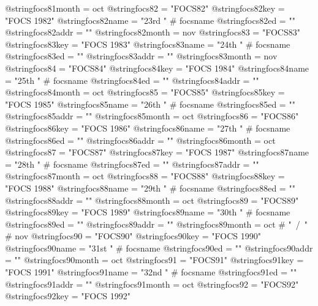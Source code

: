 @string{focs81month =           oct}
@string{focs82 =                "FOCS82"}
@string{focs82key =             "FOCS 1982"}
@string{focs82name =            "23rd " # focsname}
@string{focs82ed =              ""}
@string{focs82addr =            ""}
@string{focs82month =           nov}
@string{focs83 =                "FOCS83"}
@string{focs83key =             "FOCS 1983"}
@string{focs83name =            "24th " # focsname}
@string{focs83ed =              ""}
@string{focs83addr =            ""}
@string{focs83month =           nov}
@string{focs84 =                "FOCS84"}
@string{focs84key =             "FOCS 1984"}
@string{focs84name =            "25th " # focsname}
@string{focs84ed =              ""}
@string{focs84addr =            ""}
@string{focs84month =           oct}
@string{focs85 =                "FOCS85"}
@string{focs85key =             "FOCS 1985"}
@string{focs85name =            "26th " # focsname}
@string{focs85ed =              ""}
@string{focs85addr =            ""}
@string{focs85month =           oct}
@string{focs86 =                "FOCS86"}
@string{focs86key =             "FOCS 1986"}
@string{focs86name =            "27th " # focsname}
@string{focs86ed =              ""}
@string{focs86addr =            ""}
@string{focs86month =           oct}
@string{focs87 =                "FOCS87"}
@string{focs87key =             "FOCS 1987"}
@string{focs87name =            "28th " # focsname}
@string{focs87ed =              ""}
@string{focs87addr =            ""}
@string{focs87month =           oct}
@string{focs88 =                "FOCS88"}
@string{focs88key =             "FOCS 1988"}
@string{focs88name =            "29th " # focsname}
@string{focs88ed =              ""}
@string{focs88addr =            ""}
@string{focs88month =           oct}
@string{focs89 =                "FOCS89"}
@string{focs89key =             "FOCS 1989"}
@string{focs89name =            "30th " # focsname}
@string{focs89ed =              ""}
@string{focs89addr =            ""}
@string{focs89month =           oct # "~/~" # nov}
@string{focs90 =                "FOCS90"}
@string{focs90key =             "FOCS 1990"}
@string{focs90name =            "31st " # focsname}
@string{focs90ed =              ""}
@string{focs90addr =            ""}
@string{focs90month =           oct}
@string{focs91 =                "FOCS91"}
@string{focs91key =             "FOCS 1991"}
@string{focs91name =            "32nd " # focsname}
@string{focs91ed =              ""}
@string{focs91addr =            ""}
@string{focs91month =           oct}
@string{focs92 =                "FOCS92"}
@string{focs92key =             "FOCS 1992"}
